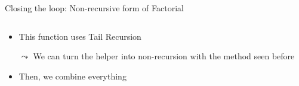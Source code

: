 \begin{frame}{Closing the loop: Non-recursive form of Factorial}
  \begin{columns}
    \begin{column}{.45\linewidth} 
    \end{column}
    \begin{column}{.5\linewidth} 
    \end{column}
  \end{columns}

  \begin{itemize}
  \item This function uses Tail Recursion
  \item[$\leadsto$] We can turn the helper into non-recursion with the method seen  before
  \item<3-> Then, we combine everything
  \end{itemize}


\end{frame}
